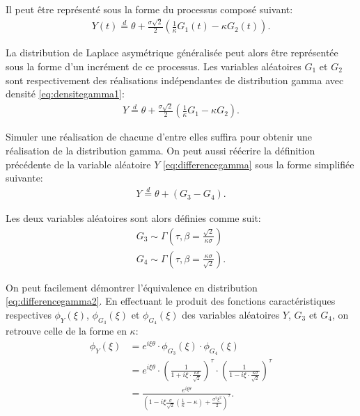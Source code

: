 Il peut être représenté sous la forme du processus composé suivant:
\begin{align}
  \label{eq:processuslaplace2gamma}
  Y(t) \stackrel{d}{=} \theta +
  \frac{\sigma\sqrt{2}}{2}\left(\frac{1}{\kappa} G_1(t) - \kappa
    G_2(t)\right).
\end{align}

La distribution de Laplace asymétrique généralisée peut alors être
représentée sous la forme d'un incrément de ce processus. Les
variables aléatoires $G_1$ et $G_2$ sont respectivement des
réalisations indépendantes de distribution gamma avec densité
\eqref{eq:densitegamma1}:
\begin{align}
  \label{eq:differencegamma}
  Y \stackrel{d}{=} \theta + \frac{\sigma\sqrt{2}}{2} \left(
    \frac{1}{\kappa} G_1 - \kappa G_2 \right).
\end{align}

Simuler une réalisation de chacune d'entre elles suffira pour obtenir
une réalisation de la distribution gamma. On peut aussi réécrire la
définition précédente de la variable aléatoire $Y$
\eqref{eq:differencegamma} sous la forme simplifiée suivante:
\begin{align}
  \label{eq:differencegamma2}
  Y \stackrel{d}{=} \theta + \left(G_3-G_4 \right).
\end{align}

Les deux variables aléatoires sont alors définies comme suit:
\begin{align*}
  G_3 \sim \Gamma\left(\tau,\beta=\frac{\sqrt{2}}{\kappa\sigma} \right)\\
  G_4 \sim \Gamma\left(\tau,\beta=\frac{\kappa\sigma}{\sqrt{2}}
  \right).
\end{align*}

On peut facilement démontrer l'équivalence en distribution
\eqref{eq:differencegamma2}. En effectuant le produit des fonctions
caractéristiques respectives $\phi_{Y}(\xi)$, $\phi_{G_3}(\xi)$ et
$\phi_{G_4}(\xi)$ des variables aléatoires $Y$, $G_3$ et $G_4$, on
retrouve celle de la forme en $\kappa$:
\begin{align}
  \label{eq:equivalence2gammaFC}
  \phi_{Y}(\xi) &= e^{i\xi\theta} \cdot \phi_{G_3}(\xi) \cdot \phi_{G_4}(\xi) \nonumber\\
  &= e^{i\xi\theta} \cdot \left(\frac{1}{1+i\xi\cdot\frac{\kappa\sigma}{\sqrt{2}}}\right)^{\tau} \cdot \left(\frac{1}{1-i\xi\cdot\frac{\kappa\sigma}{\sqrt{2}}}\right)^{\tau} \nonumber\\
  &=
  \frac{e^{i\xi\theta}}{\left(1-i\xi\frac{\sigma}{\sqrt{2}}\left(\frac{1}{\kappa}-\kappa
      \right) + \frac{\sigma^2\xi^2}{2}\right)^{\tau}}.
\end{align}

